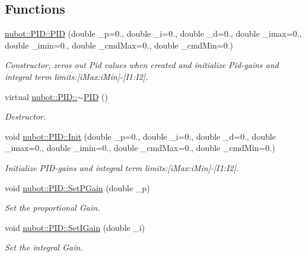 \subsection*{Functions}
\begin{DoxyCompactItemize}
\item 
\hyperlink{group__gazebo__common_gae71f7fb98fd3cd275d83dcc6ba37678e}{nubot\-::\-P\-I\-D\-::\-P\-I\-D} (double \-\_\-p=0., double \-\_\-i=0., double \-\_\-d=0., double \-\_\-imax=0., double \-\_\-imin=0., double \-\_\-cmd\-Max=0., double \-\_\-cmd\-Min=0.)
\begin{DoxyCompactList}\small\item\em Constructor, zeros out Pid values when created and initialize Pid-\/gains and integral term limits\-:\mbox{[}i\-Max\-:i\-Min\mbox{]}-\/\mbox{[}I1\-:I2\mbox{]}. \end{DoxyCompactList}\item 
virtual \hyperlink{group__gazebo__common_gab7d389fc5b88d881bc25f5dafd360441}{nubot\-::\-P\-I\-D\-::$\sim$\-P\-I\-D} ()
\begin{DoxyCompactList}\small\item\em Destructor. \end{DoxyCompactList}\item 
void \hyperlink{group__gazebo__common_ga382ce53f7a1ad7d86cbd86a25a100ec7}{nubot\-::\-P\-I\-D\-::\-Init} (double \-\_\-p=0., double \-\_\-i=0., double \-\_\-d=0., double \-\_\-imax=0., double \-\_\-imin=0., double \-\_\-cmd\-Max=0., double \-\_\-cmd\-Min=0.)
\begin{DoxyCompactList}\small\item\em Initialize P\-I\-D-\/gains and integral term limits\-:\mbox{[}i\-Max\-:i\-Min\mbox{]}-\/\mbox{[}I1\-:I2\mbox{]}. \end{DoxyCompactList}\item 
void \hyperlink{group__gazebo__common_gae2e298baa50a7dee51d56ffe08c250a0}{nubot\-::\-P\-I\-D\-::\-Set\-P\-Gain} (double \-\_\-p)
\begin{DoxyCompactList}\small\item\em Set the proportional Gain. \end{DoxyCompactList}\item 
void \hyperlink{group__gazebo__common_ga3787d609a4559005dcfc0d66565748aa}{nubot\-::\-P\-I\-D\-::\-Set\-I\-Gain} (double \-\_\-i)
\begin{DoxyCompactList}\small\item\em Set the integral Gain. \end{DoxyCompactList}\item 

\end{DoxyCompactItemize}
